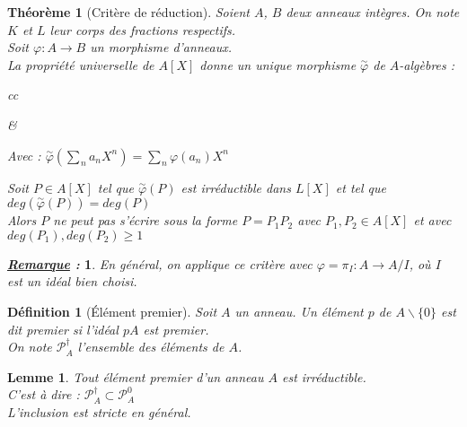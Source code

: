 \documentclass{article}           %
\newcommand\set[1]{\mathbb{#1}} 				%
\newcommand\cali[1]{\mathcal{#1}} 				%
\newcommand\summ[2]{\underset{#1}{\overset{#2}{\sum}}} 		%
\newcommand\noset[1]{\backslash{#1}} 	%
\newcommand\nozero{\backslash \{0\}} 	%
\theoremstyle{break}
\theoremstyle{add}
\theoremstyle{break} %
\newtheorem{theoreme}{Théorème}[section]
\newtheorem{lemme}{Lemme}[section]
\newtheorem{definition}{Définition}[section]
\theoremstyle{add}
\newtheorem*{remarque}{\textit{\underline{Remarque} : }}
\begin{document}
\begin{theoreme}[Critère de réduction]
Soient $A$, $B$ deux anneaux intègres. On note $K$ et $L$ leur corps des fractions respectifs. \\
Soit $\varphi : A \longrightarrow B$ un morphisme d'anneaux. \\
La propriété universelle de $A[X]$ donne un unique morphisme $\overset{\sim}{\varphi}$ de $A$-algèbres :

\begin{tabular}{cc}
\\
&

Avec : $\overset{\sim}{\varphi}(\summ{n}{}a_nX^n) = \summ{n}{}\varphi(a_n)X^n$
\\
\end{tabular}

Soit $P \in A[X]$ tel que $\overset{\sim}{\varphi}(P)$ est irréductible dans $L[X]$ et tel que $deg (\overset{\sim}{\varphi}(P)) = deg(P)$ \\

Alors $P$ ne peut pas s'écrire sous la forme $P=P_1P_2$ avec $P_1,P_2 \in A[X]$ et avec $deg(P_1), deg(P_2) \geq 1$
\end{theoreme}

\begin{remarque}
En général, on applique ce critère avec $\varphi = \pi_I : A \longrightarrow A/I$, où $I$ est un idéal bien choisi.
\end{remarque}

\begin{definition}[Élément premier]
Soit $A$ un anneau. Un élément $p$ de $A\nozero$ est dit \textit{premier} si l'idéal $pA$ est premier. \\
On note $\cali{P}_A^{\dagger}$ l'ensemble des éléments de $A$.
\end{definition}

\begin{lemme}
Tout élément premier d'un anneau $A$ est irréductible. \\
C'est à dire : $\cali{P}_A^{\dagger} \subset \cali{P}_A^{0}$ \\

L'inclusion est stricte en général.
\end{lemme}
\end{document}
